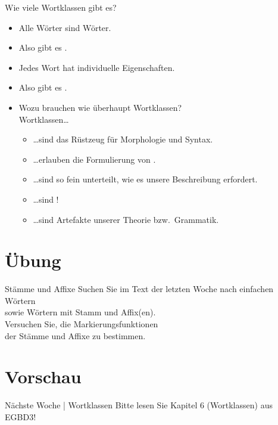 \begin{frame}
  {Wie viele Wortklassen gibt es?}
  \pause
  \begin{itemize}[<+->]
    \item Alle Wörter sind \alert{Wörter}.
    \item Also gibt es .
      \Zeile
    \item Jedes Wort hat \alert{individuelle Eigenschaften}.
    \item Also gibt es .
      \Zeile
    \item Wozu brauchen wie überhaupt Wortklassen?\\
      Wortklassen\dots
      \begin{itemize}[<+->]
        \item \dots sind \alert{das Rüstzeug für Morphologie und Syntax}.
        \item \dots erlauben die Formulierung von .
        \item \dots sind so fein unterteilt, wie es unsere Beschreibung erfordert.
        \item \dots sind !
        \item \dots sind \alert{Artefakte unserer Theorie bzw.\ Grammatik}.
      \end{itemize}
  \end{itemize}
\end{frame}




\section{Übung}

\begin{frame}
  {Stämme und Affixe}
  \Zeile
  \centering 
  Suchen Sie im Text der letzten Woche nach \alert{einfachen Wörtern}\\
  sowie \alert{Wörtern mit Stamm und Affix(en)}.\\
  \Zeile
  Versuchen Sie, die \alert{Markierungsfunktionen}\\
  der Stämme und Affixe zu bestimmen.
\end{frame}

\section{Vorschau}

\begin{frame}
  {Nächste Woche | Wortklassen}
  \Zeile
  \centering 
  Bitte lesen Sie  \alert{Kapitel 6 (Wortklassen)} aus EGBD3!
\end{frame}
